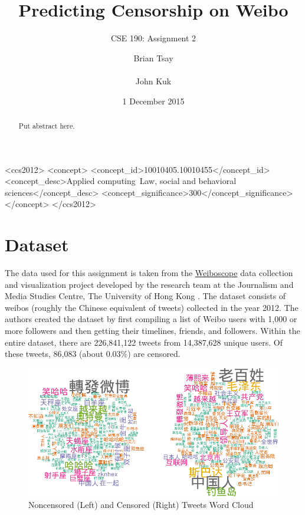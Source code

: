 \documentclass{sig-alternate-05-2015}
\begin{document}
\title{Predicting Censorship on Weibo}
\subtitle{CSE 190: Assignment 2}

\author{
  \alignauthor
  Brian Tsay \\
   \\
  \alignauthor
  John Kuk \\
}

\date{1 December 2015}

\maketitle

\begin{abstract}
  Put abstract here.
\end{abstract}


 \begin{CCSXML}
<ccs2012>
<concept>
<concept_id>10010405.10010455</concept_id>
<concept_desc>Applied computing~Law, social and behavioral sciences</concept_desc>
<concept_significance>300</concept_significance>
</concept>
</ccs2012>
\end{CCSXML}

\printccsdesc

\section{Dataset} \label{sec:data}
The data used for this assignment is taken from the \href{http://weiboscope.jmsc.hku.hk/datazip/}{Weiboscope} data collection and visualization project developed by the research team at the Journalism and Media Studies Centre, The University of Hong Kong \cite{Fu2013a}. The dataset consists of weibos (roughly the Chinese equivalent of tweets) collected in the year 2012. The authors created the dataset by first compiling a list of Weibo users with 1,000 or more followers and then getting their timelines, friends, and followers. Within the entire dataset, there are 226,841,122 tweets from 14,387,628 unique users. Of these tweets, 86,083 (about 0.03\%) are censored.

\begin{figure}
  \centering
  \includegraphics[scale = 0.65]{wc.png}
  \caption{Noncensored (Left) and Censored (Right) Tweets Word Cloud}
  \label{fig:wordcloud}
\end{figure}
\end{document}
